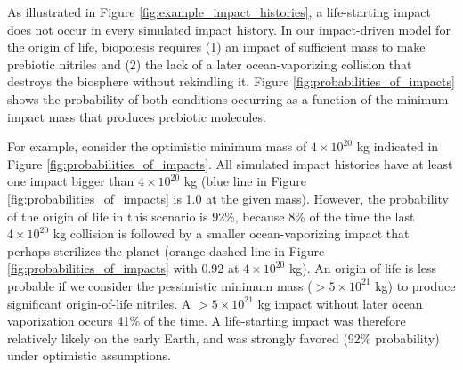 \documentclass{aastex631}
\begin{document}
As illustrated in Figure \ref{fig:example_impact_histories}, a life-starting impact does not occur in every simulated impact history. In our impact-driven model for the origin of life, biopoiesis requires (1) an impact of sufficient mass to make prebiotic nitriles and (2) the lack of a later ocean-vaporizing collision that destroys the biosphere without rekindling it. Figure \ref{fig:probabilities_of_impacts} shows the probability of both conditions occurring as a function of the minimum impact mass that produces prebiotic molecules. 

For example, consider the \citet{Wogan_2023} optimistic minimum mass of $4 \times 10^{20}$ kg indicated in Figure \ref{fig:probabilities_of_impacts}. All simulated impact histories have at least one impact bigger than $4 \times 10^{20}$ kg (blue line in Figure \ref{fig:probabilities_of_impacts} is 1.0 at the given mass). However, the probability of the origin of life in this scenario is 92\%, because 8\% of the time the last $4 \times 10^{20}$ kg collision is followed by a smaller ocean-vaporizing impact that perhaps sterilizes the planet (orange dashed line in Figure \ref{fig:probabilities_of_impacts} with 0.92 at $4 \times 10^{20}$ kg). An origin of life is less probable if we consider the \citet{Wogan_2023} pessimistic minimum mass ($> 5 \times 10^{21}$ kg) to produce significant origin-of-life nitriles. A $> 5 \times 10^{21}$ kg impact without later ocean vaporization occurs 41\% of the time. A life-starting impact was therefore relatively likely on the early Earth, and was strongly favored (92\% probability) under optimistic assumptions.
\end{document}
